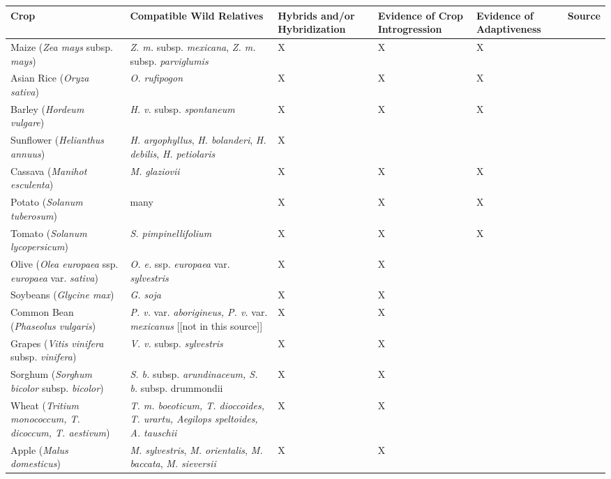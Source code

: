 \documentclass[11pt]{article}
\begin{document}
\begin{table}
\centering
\begin{adjustbox}{width=1\textwidth}
\small
\label{my-label}
\begin{tabular}{|p{5cm}|p{5cm}|p{2.6cm}|p{2.6cm}|p{2.6cm}|l|}
\hline
Crop & Compatible Wild Relatives & Hybrids and/or Hybridization & Evidence of Crop Introgression & Evidence of Adaptiveness & Source \\ \hline \hline
Maize (\emph{Zea mays} subsp. \emph{mays}) & \emph{Z. m.} subsp. \emph{mexicana}, \emph{Z. m. } subsp. \emph{parviglumis} & X & X & X & \cite{Hufford2013} \\ 
\hline 
Asian Rice (\emph{Oryza sativa}) & \emph{O. rufipogon} & X & X & X & \cite{Huang2012} \\ 
\hline
Barley (\emph{Hordeum vulgare}) & \emph{H. v.} subsp. \emph{spontaneum} & X & X & X & \cite{Poets2015} \\ \hline
Sunflower (\emph{Helianthus annuus}) & \emph{H. argophyllus}, \emph{H. bolanderi}, \emph{H. debilis}, \emph{H. petiolaris} & X &   &   & \cite{rieseberg2007hybridization}\\ 
\hline
Cassava (\emph{Manihot esculenta}) & \emph{M. glaziovii} & X & X & X & \cite{bredeson2016sequencing} \\ 
\hline
Potato (\emph{Solanum tuberosum}) & many & X & X & X & \cite{hardigan2017genome, johns1986ongoing, gavrilenko2013genetic} \\
\hline
Tomato (\emph{Solanum lycopersicum}) & \emph{S. pimpinellifolium} & X & X & X & \cite{rick1958role} \\
\hline
Olive (\emph{Olea europaea} ssp. \emph{europaea} var. \emph{sativa}) & \emph{O. e.} ssp. \emph{europaea} var. \emph{sylvestris} & X & X & & \cite{diez2015olive} \\ 
\hline
Soybeans (\emph{Glycine max}) & \emph{G. soja} & X & X &  & \cite{lam2010resequencing} \\ 
\hline
Common Bean (\emph{Phaseolus vulgaris}) & \emph{P. v.} var. \emph{aborigineus, P. v.} var. \emph{mexicanus} [[not in this source]]& X & X &  & \cite{papa2003asymmetry} \\
\hline
Grapes (\emph{Vitis vinifera} subsp. \emph{vinifera}) & \emph{V. v.} subsp. \emph{sylvestris} & X & X &  &  \cite{myles2011genetic} \\
\hline
Sorghum (\emph{Sorghum bicolor} subsp. \emph{bicolor}) & \emph{S. b.} subsp. \emph{arundinaceum, S. b.} subsp. {drummondii} & X & X &  & \cite{aldrich1992patterns} \\
\hline
Wheat (\emph{Tritium monococcum, T. dicoccum, T. aestivum}) & \emph{T. m. boeoticum, T. dioccoides, T. urartu, Aegilops speltoides, A. tauschii} & X & X &  & \cite{zohary1969wild} \\
\hline
Apple (\emph{Malus domesticus}) & \emph{M. sylvestris}, \emph{M. orientalis}, \emph{M. baccata}, \emph{M. sieversii}  & X & X & & \cite{cornille2012new} \\
\hline
\end{tabular}
\end{adjustbox}
\end{table}
\end{document}
